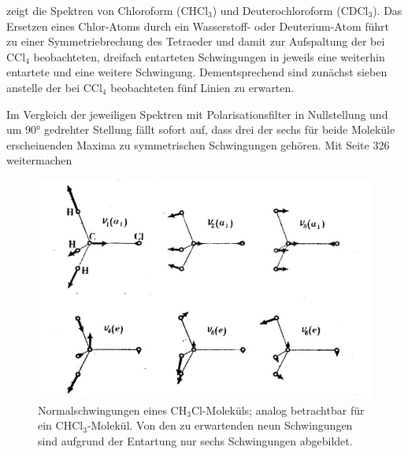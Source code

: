 \documentclass[../bericht.tex]{subfiles}
\begin{document}
         zeigt die Spektren von Chloroform ($\mathrm{CHCl_3}$) und Deuterochloroform ($\mathrm{CDCl_3}$). Das Ersetzen eines Chlor-Atoms durch ein Wasserstoff- oder Deuterium-Atom führt zu einer Symmetriebrechung des Tetraeder und  damit zur Aufspaltung der bei $\mathrm{CCl_4}$ beobachteten, dreifach entarteten Schwingungen in jeweils eine weiterhin entartete und eine weitere Schwingung. Dementsprechend sind zunächst sieben anstelle der bei $\mathrm{CCl_4}$ beobachteten fünf Linien zu erwarten.

        Im Vergleich der jeweiligen Spektren mit Polarisationsfilter in Nullstellung und um $\ang{90}$ gedrehter Stellung fällt sofort auf, dass drei der sechs für beide Moleküle erscheinenden Maxima zu symmetrischen Schwingungen gehören.
        Mit Seite 326 weitermachen

        \begin{figure}[tb]
          \includegraphics[width=\textwidth]{figures/ch3cl.png}
          \caption[Normalschwingungen eines $\mathrm{CH_3Cl}$-Moleküls; analog betrachtbar für ein $\mathrm{CHCl_3}$-Molekül.]{Normalschwingungen eines $\mathrm{CH_3Cl}$-Moleküls; analog betrachtbar für ein $\mathrm{CHCl_3}$-Molekül. Von den zu erwartenden neun Schwingungen sind aufgrund der Entartung nur sechs Schwingungen abgebildet. \cite{herzberg}}
          \label{}
        \end{figure}
\end{document}
